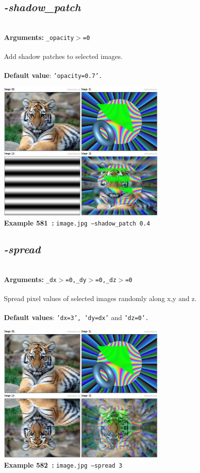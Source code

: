 \documentclass[a4paper,11pt,twoside]{book}
\begin{document}
\subsection{\emph{-shadow\_patch} }\vspace*{-0.5em}
~\\\textbf{Arguments: } 
{\small \texttt{\_opacity$>$=0}}\\~\\
Add shadow patches to selected images.
~\\~\\\textbf{Default value}: {\small \texttt{'opacity=0.7'.}}
\begin{center}\includegraphics[keepaspectratio=true,height=7cm,width=\textwidth]{img/gmic_def581.jpg}\\
{\footnotesize \textbf{Example 581~:} \texttt{image.jpg --shadow\_patch 0.4}}
\end{center}

\subsection{\emph{-spread} }\vspace*{-0.5em}
~\\\textbf{Arguments: } 
{\small \texttt{\_dx$>$=0,\_dy$>$=0,\_dz$>$=0}}\\~\\
Spread pixel values of selected images randomly along x,y and z.
~\\~\\\textbf{Default values}: {\small \texttt{'dx=3', 'dy=dx'} and \texttt{'dz=0'.}}
\begin{center}\includegraphics[keepaspectratio=true,height=7cm,width=\textwidth]{img/gmic_def582.jpg}\\
{\footnotesize \textbf{Example 582~:} \texttt{image.jpg --spread 3}}
\end{center}
\end{document}
